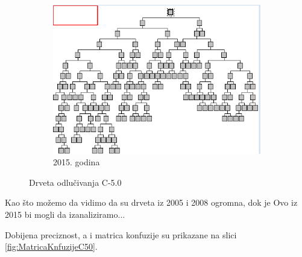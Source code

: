 \documentclass[a4paper]{article}
\begin{document}
\begin{figure}[H]
	\vspace{0.5cm}
	\begin{subfigure}[h]{\textwidth}
		\begin{center}
			\includegraphics[scale=0.60]{Klasifikacija/C50/MapaDrvetaOdlucivanja2015.png}
		\end{center}
		\caption{2015. godina}
		\label{fig:DrvoOdlucivanjaC502015}
	\end{subfigure}
	
	\caption{Drveta odlučivanja C-5.0}
	\label{fig:DrvoOdlucivanjaC50}
\end{figure}

Kao što možemo da vidimo da su drveta iz 2005 i 2008 ogromna, dok je {\color{red}Ovo iz 2015 bi mogli da izanaliziramo...}

Dobijena preciznost, a i matrica konfuzije su prikazane na slici \ref{fig:MatricaKnfuzijeC50}.
\end{document}

